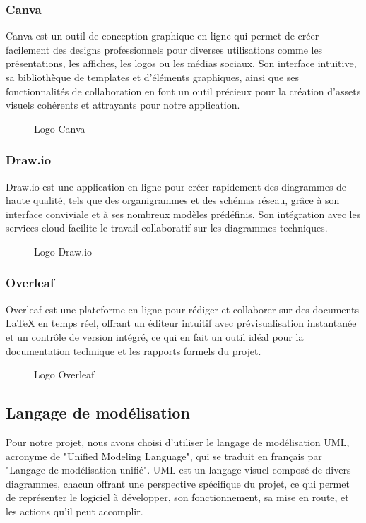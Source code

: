 \subsubsection*{Canva}
Canva est un outil de conception graphique en ligne qui permet de créer facilement des designs professionnels pour diverses utilisations comme les présentations, les affiches, les logos ou les médias sociaux. Son interface intuitive, sa bibliothèque de templates et d'éléments graphiques, ainsi que ses fonctionnalités de collaboration en font un outil précieux pour la création d'assets visuels cohérents et attrayants pour notre application.\cite{b21}
\begin{figure}[H]
\centering
{}
\caption{Logo Canva}
\end{figure}

\subsubsection*{Draw.io}
Draw.io est une application en ligne pour créer rapidement des diagrammes de haute qualité, tels que des organigrammes et des schémas réseau, grâce à son interface conviviale et à ses nombreux modèles prédéfinis. Son intégration avec les services cloud facilite le travail collaboratif sur les diagrammes techniques.\cite{b22}
\begin{figure}[H]
\centering
{}
\caption{Logo Draw.io}
\end{figure}

\subsubsection*{Overleaf}
Overleaf est une plateforme en ligne pour rédiger et collaborer sur des documents LaTeX en temps réel, offrant un éditeur intuitif avec prévisualisation instantanée et un contrôle de version intégré, ce qui en fait un outil idéal pour la documentation technique et les rapports formels du projet.\cite{b23}
\begin{figure}[H]
\centering
{}
\caption{Logo Overleaf}
\end{figure}

\subsection{Langage de modélisation}
Pour notre projet, nous avons choisi d'utiliser le langage de modélisation UML, acronyme de "Unified Modeling Language", qui se traduit en français par "Langage de modélisation unifié". UML est un langage visuel composé de divers diagrammes, chacun offrant une perspective spécifique du projet, ce qui permet de représenter le logiciel à développer, son fonctionnement, sa mise en route, et les actions qu'il peut accomplir.

